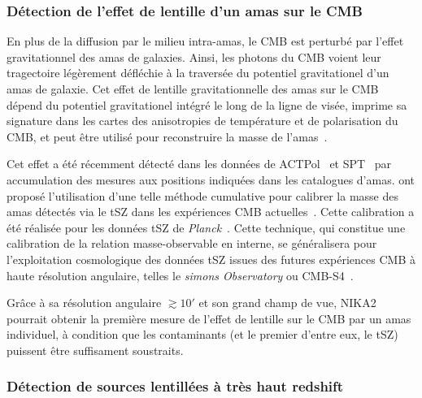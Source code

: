 \subsubsection{Détection de l'effet de lentille d'un amas sur le CMB}

En plus de la diffusion par le milieu intra-amas, le CMB est perturbé
par l'effet gravitationnel des amas de galaxies. Ainsi, les photons du
CMB voient leur tragectoire légèrement défléchie à la traversée du
potentiel gravitationel d'un amas de galaxie. Cet effet de lentille
gravitationnelle des amas sur le CMB dépend du potentiel gravitationel
intégré le long de la ligne de visée, imprime sa signature dans les
cartes des anisotropies de température et de polarisation du CMB, et
peut être utilisé pour reconstruire la masse de
l'amas~\citep{Seljak2000, Hu2007}.

Cet effet a été récemment détecté dans les données de
ACTPol~\citep{Madhavacheril2015} et SPT~\citep{Baxter2015} par
accumulation des mesures aux positions indiquées dans les catalogues
d'amas. \citet{Melin2015} ont proposé l'utilisation d'une telle méthode
cumulative pour calibrer la masse des amas détectés via le
tSZ  dans les expériences CMB actuelles~\citep{Melin2015}. Cette
calibration a été réalisée pour les données tSZ de
\emph{Planck}~\citep{Planck_2016_SZ_cosmo, Zulbedia2019}. 
Cette technique, qui constitue une calibration de la relation
masse-observable en interne, se généralisera pour l'exploitation
cosmologique des données tSZ issues des futures expériences CMB à
haute résolution angulaire, telles le \emph{simons Observatory} ou
CMB-S4~\citep{Louis2017}.

Grâce à sa résolution angulaire $\gtrsim 10'$ et son grand champ de
vue, NIKA2 pourrait obtenir la première mesure de l'effet de lentille
sur le CMB par un amas individuel, à condition que les contaminants (et
le premier d'entre eux, le tSZ) puissent être suffisament soustraits. 

\subsubsection{Détection de sources lentillées à très haut redshift}

